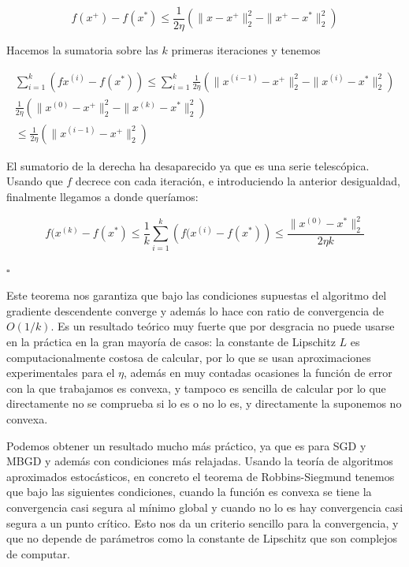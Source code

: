 $$ f(x^+) - f(x^*) \leq  \frac{1}{2\eta}  \left ( \| x - x^+ \|^2_2 -  \| x^+ - x^* \|^2_2 \right ) $$

Hacemos la sumatoria sobre las $k$ primeras iteraciones y tenemos

\begin{gather*}
    \sum^k_{i=1} \left ( fx^{(i)} - f(x^*) \right ) \leq \sum^k_{i=1} \frac{1}{2\eta}  \left ( \| x^{(i-1)} - x^+ \|^2_2 -  \| x^{(i)} - x^* \|^2_2 \right ) \\ 
    \frac{1}{2\eta}  \left ( \| x^{(0)} - x^+ \|^2_2 -  \| x^{(k)} - x^* \|^2_2 \right ) \\ 
    \leq \frac{1}{2\eta}  \left ( \| x^{(i-1)} - x^+ \|^2_2 \right )  
\end{gather*}

El sumatorio de la derecha ha desaparecido ya que es una serie telescópica. Usando que $f$ decrece con cada iteración, e introduciendo la anterior desigualdad, finalmente llegamos a donde queríamos:

$$f(x^{(k)} - f(x^*) \leq \frac{1}{k} \sum ^k _{i=1} \left ( f(x^{(i)} - f(x^*) \right ) \leq \frac{\|x^{(0)}-x^* \|^2_2}{2\eta k} $$


\begin{flushright}
    $\square$
\end{flushright} 


Este teorema nos garantiza que bajo las condiciones supuestas el algoritmo del gradiente descendente converge y además lo hace con ratio de convergencia de $O(1/k)$. Es un resultado teórico muy fuerte que por desgracia no puede usarse en la práctica en la gran mayoría de casos: la constante de Lipschitz $L$ es computacionalmente costosa de calcular, por lo que se usan aproximaciones experimentales para el $\eta$, además en muy contadas ocasiones la función de error con la que trabajamos es convexa, y tampoco es sencilla de calcular por lo que directamente no se comprueba si lo es o no lo es, y directamente la suponemos no convexa. 

Podemos obtener un resultado mucho más práctico, ya que es para SGD y MBGD y además con condiciones más relajadas. Usando la teoría de algoritmos aproximados estocásticos, en concreto el teorema de Robbins-Siegmund tenemos que bajo las siguientes condiciones, cuando la función es convexa se tiene la convergencia casi segura al mínimo global y cuando no lo es hay convergencia casi segura a un punto crítico. Esto nos da un criterio sencillo para la convergencia, y que no depende de parámetros como la constante de Lipschitz que son complejos de computar.


